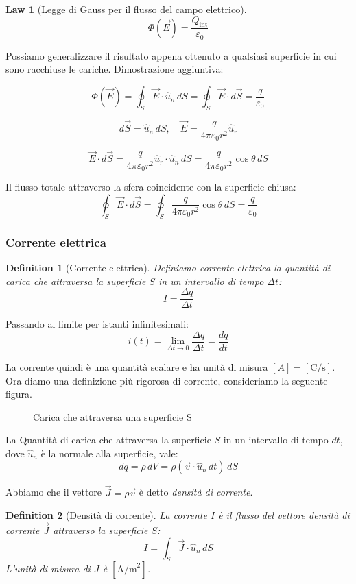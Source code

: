 \documentclass[12pt, a4paper]{article}
\newtheorem{definition}{Definition}[section]
\newtheorem{theorem}{Law}[section]
\begin{document}
\newpage

\begin{theorem}[Legge di Gauss per il flusso del campo elettrico]
\[
\Phi(\vec{E}) = \frac{Q_{\text{int}}}{\varepsilon_0}
\]
\end{theorem}
Possiamo generalizzare il risultato appena ottenuto a qualsiasi superficie in cui sono racchiuse le cariche.
Dimostrazione aggiuntiva:

\begin{figure}[h]
    \centering
\end{figure}

\[
\Phi(\vec{E}) = \oint_S \vec{E} \cdot \hat{u}_n \, dS = \oint_S \vec{E} \cdot d\vec{S} = \frac{q}{\varepsilon_0}
\]

\[
d\vec{S} = \hat{u}_n \, dS, \quad \vec{E} = \frac{q}{4\pi\varepsilon_0 r^2} \hat{u}_r
\]

\[
\vec{E} \cdot d\vec{S} = \frac{q}{4\pi\varepsilon_0 r^2} \hat{u}_r \cdot \hat{u}_n \, dS = \frac{q}{4\pi\varepsilon_0 r^2} \cos\theta \, dS
\]

Il flusso totale attraverso la sfera coincidente con la superficie chiusa:
\[
\oint_S \vec{E} \cdot d\vec{S} = \oint_S \frac{q}{4\pi\varepsilon_0 r^2} \cos\theta \, dS = \frac{q}{\varepsilon_0}
\]

\newpage

\subsubsection{Corrente elettrica}
\begin{definition}[Corrente elettrica]
Definiamo corrente elettrica la quantità di carica che attraversa la superficie $S$ in un intervallo di tempo $\Delta t$:
\[
I = \frac{\Delta q}{\Delta t}
\]
\end{definition}

Passando al limite per istanti infinitesimali:
\[
i(t) = \lim_{\Delta t \to 0} \frac{\Delta q}{\Delta t} = \frac{dq}{dt}
\]

La corrente quindi è una quantità scalare e ha unità di misura $[A] = [\text{C/s}]$.
Ora diamo una definizione più rigorosa di corrente, consideriamo la seguente figura.

\begin{figure}[h]
    \centering
    \caption{Carica che attraversa una superficie S}
\end{figure}

La Quantità di carica che attraversa la superficie $S$ in un intervallo di tempo $dt$, dove $\hat{u}_n$ è la normale alla superficie, vale:
\[
dq = \rho \, dV = \rho (\vec{v} \cdot \hat{u}_n \, dt) \, dS
\]

Abbiamo che il vettore $\vec{J} = \rho \vec{v}$ è detto \textit{densità di corrente}.

\begin{definition}[Densità di corrente]
La corrente $I$ è il flusso del vettore densità di corrente $\vec{J}$ attraverso la superficie $S$:
\[
I = \int_S \vec{J} \cdot \hat{u}_n \, dS
\]
L'unità di misura di $J$ è $[\text{A/m}^2]$.
\end{definition}
\end{document}
